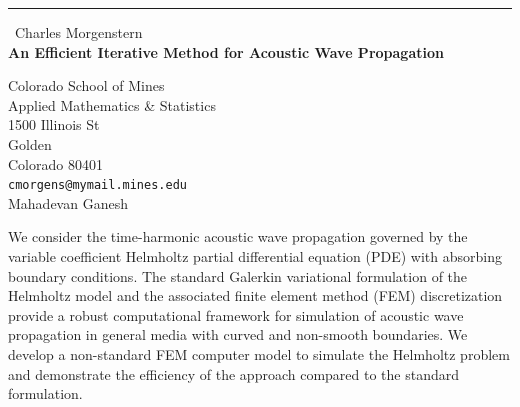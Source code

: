 \documentclass{report}
\begin{document}
\begin{center}
\rule{6in}{1pt} \
{\large Charles Morgenstern \\
{\bf An Efficient Iterative Method for Acoustic Wave Propagation}}

Colorado School of Mines \\ Applied Mathematics \& Statistics \\ 1500 Illinois St \\ Golden \\ Colorado 80401
\\
{\tt cmorgens@mymail.mines.edu}\\
Mahadevan Ganesh\end{center}

We consider the time-harmonic acoustic wave propagation governed by the
variable coefficient Helmholtz partial differential equation (PDE) with
absorbing boundary conditions. The standard Galerkin variational
formulation of the Helmholtz model and the associated finite element
method (FEM) discretization provide a robust computational framework for
simulation of acoustic wave propagation in general media with curved and
non-smooth boundaries. We develop a non-standard FEM computer model to
simulate the Helmholtz problem and demonstrate the efficiency of the
approach compared to the standard formulation.
\end{document}
